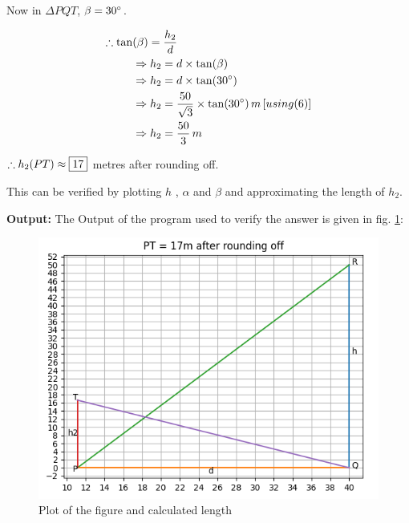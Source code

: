 \documentclass[journal,12pt,twocolumn,hidelinks]{IEEEtran}
\begin{document}
\begin{flushleft}
Now in $\Delta PQT$, $\beta = 30\degree$.

\begin{align}
\therefore \tan&(\beta) = \frac{h_2}{d} \\
&\Rightarrow h_2 = d \times \tan(\beta)\\
&\Rightarrow h_2 = d \times \tan(30 \degree)\\
&\Rightarrow h_2 = \frac{50}{\sqrt{3}} \times \tan(30 \degree) \, m \, [using (6)]\\
&\Rightarrow h_2 = \frac{50}{3}\, m
\end{align}

$\therefore h_2(PT)   \approx \fbox{17} $ metres after rounding off.

This can be verified by plotting $h$ , $\alpha$ and $\beta$ and approximating 
the length of $h_2$.

\noindent\textbf{Output:}
The Output of the program used to verify the answer is given in fig. \ref{fig:fig-2}:

\begin{figure}[!ht]
\centering
\includegraphics[width=\columnwidth]{figures/output.png}
\caption{Plot of the figure and calculated length}
\label{fig:fig-2}
\end{figure}

\end{flushleft}
\end{document}
